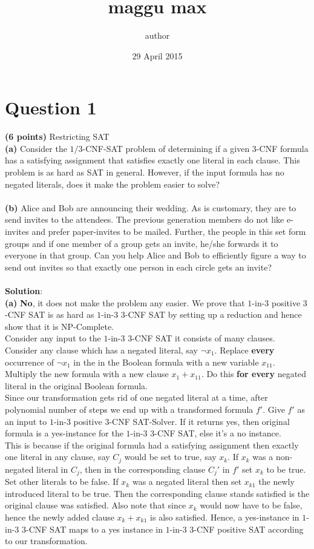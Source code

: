 \documentclass{article}
\title{maggu max}
\author{author }
\date{29 April 2015}
\begin{document}
\maketitle

\section{Question 1}
{\bf (6 points)} Restricting SAT\\
{\bf (a)} Consider the $1/3$-CNF-SAT problem of determining if a given $3$-CNF formula has a satisfying assignment that satisfies exactly one literal in each clause. This problem is as hard as SAT in general. However, if the input formula has no negated literals, does it make the problem easier to solve?\\\\
{\bf (b)} Alice and Bob are announcing their wedding. As is customary, they are to send invites to the attendees. The previous generation members do not like e-invites and prefer paper-invites to be mailed. Further, the people in this set form groups and if one member of a group gets an invite, he/she forwards it to everyone in that group. Can you help Alice and Bob to efficiently figure a way to send out invites so that exactly one person in each circle gets an invite?\\\\
{\bf Solution}:\\
{\bf (a)} {\bf No}, it does not make the problem any easier. We prove that $1$-in-$3$ positive $3$-CNF SAT is as hard as $1$-in-$3$ $3$-CNF SAT by setting up a reduction and hence show that it is NP-Complete.\\
Consider any input to the $1$-in-$3$ $3$-CNF SAT it consists of many clauses. Consider any clause which has a negated literal, say $\neg x_{1}$. Replace {\bf every} occurrence of $\neg x_{1}$ in the in the Boolean formula with a new variable $x_{11}$. Multiply the new formula with a new clause $x_{1}+x_{11}$. Do this {\bf for every} negated literal in the original Boolean formula.\\
Since our transformation gets rid of one negated literal at a time, after polynomial number of steps we end up with a transformed formula $f'$. Give $f'$ as an input to $1$-in-$3$ positive $3$-CNF SAT-Solver. If it returns yes, then original formula is a yes-instance for the $1$-in-$3$ $3$-CNF SAT, else it's a no instance.\\
This is because if the original formula had a satisfying assignment then exactly one literal in any clause, say $C_{j}$  would be set to true, say $x_{k}$. If $x_{k}$ was a non-negated literal in $C_{j}$, then in the corresponding clause $C_{j}'$ in $f'$ set $x_{k}$ to be true. Set other literals to be false. If $x_{k}$ was a negated literal then set $x_{k1}$ the newly introduced literal to be true. Then the corresponding clause stands satisfied is the original clause was satisfied. Also note that since $x_{k}$ would now have to be false, hence the newly added clause $x_{k} + x_{k1}$ is also satisfied. Hence, a yes-instance in $1$-in-$3$ $3$-CNF SAT maps to a yes instance in $1$-in-$3$ $3$-CNF positive SAT according to our transformation.\\
\end{document}
